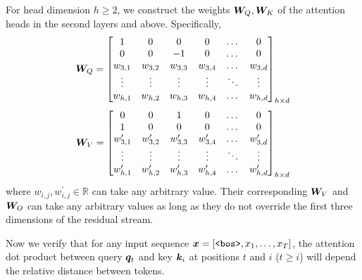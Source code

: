 \documentclass{article}
\begin{document}
For head dimension $h\ge 2$, we construct the weights ${\bm{W}}_Q, {\bm{W}}_K$ of the attention heads in the second layers and above. Specifically,
\begin{align}
  \label{eq:rel_query}
  {\bm{W}}_Q = \begin{bmatrix}
            1        & 0        & 0        & 0        & \dots  & 0        \\
            0        & 0        & -1       & 0        & \dots  & 0        \\
            w_{3, 1} & w_{3, 2} & w_{3, 3} & w_{3, 4} & \dots  & w_{3, d} \\
            \vdots   & \vdots   & \vdots   & \vdots   & \ddots & \vdots   \\
            w_{h, 1} & w_{h, 2} & w_{h, 3} & w_{h, 4} & \dots  & w_{h, d}
          \end{bmatrix}_{h \times d}
\end{align}
\begin{align}
  \label{eq:rel_key}
  {\bm{W}}_V = \begin{bmatrix}
            0               & 0               & 1               & 0               & \dots  & 0               \\
            1               & 0               & 0               & 0               & \dots  & 0               \\
            w^\prime_{3, 1} & w^\prime_{3, 2} & w^\prime_{3, 3} & w^\prime_{3, 4} & \dots  & w^\prime_{3, d} \\
            \vdots          & \vdots          & \vdots          & \vdots          & \ddots & \vdots          \\
            w^\prime_{h, 1} & w^\prime_{h, 2} & w^\prime_{h, 3} & w^\prime_{h, 4} & \dots  & w^\prime_{h, d}
          \end{bmatrix}_{h \times d}
\end{align}
where $w_{i,j}, w^\prime_{i,j} \in \mathbb{R}$ can take any arbitrary value.
Their corresponding ${\bm{W}}_V$ and ${\bm{W}}_O$ can take any arbitrary values as long as they do not override the first three dimensions of the residual stream.

Now we verify that for any input sequence ${\bm{x}} = \left[\texttt{<bos>}, x_1, \ldots, x_T\right]$, the attention dot product between query ${\bm{q}}_t$ and key ${\bm{k}}_i$ at positions $t$ and $i$ ($t \ge i$) will depend the relative distance between tokens.
\end{document}
